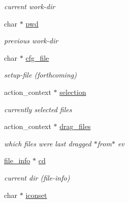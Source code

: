\begin{CompactItemize}
\begin{CompactList}\small\item\em current work-dir \item\end{CompactList}\item 
\hypertarget{struct__noir__sess_o19}{
char $\ast$ \hyperlink{struct__noir__sess_o19}{pwd}}
\label{struct__noir__sess_o19}

\begin{CompactList}\small\item\em previous work-dir \item\end{CompactList}\item 
\hypertarget{struct__noir__sess_o20}{
char $\ast$ \hyperlink{struct__noir__sess_o20}{cfg\_\-file}}
\label{struct__noir__sess_o20}

\begin{CompactList}\small\item\em setup-file (forthcoming) \item\end{CompactList}\item 
\hypertarget{struct__noir__sess_o21}{
action\_\-context $\ast$ \hyperlink{struct__noir__sess_o21}{selection}}
\label{struct__noir__sess_o21}

\begin{CompactList}\small\item\em currently selected files \item\end{CompactList}\item 
\hypertarget{struct__noir__sess_o22}{
action\_\-context $\ast$ \hyperlink{struct__noir__sess_o22}{drag\_\-files}}
\label{struct__noir__sess_o22}

\begin{CompactList}\small\item\em which files were last dragged $\ast$from$\ast$ ev \item\end{CompactList}\item 
\hypertarget{struct__noir__sess_o23}{
\hyperlink{struct__file__info}{file\_\-info} $\ast$ \hyperlink{struct__noir__sess_o23}{cd}}
\label{struct__noir__sess_o23}

\begin{CompactList}\small\item\em current dir (file-info) \item\end{CompactList}\item 
\hypertarget{struct__noir__sess_o24}{
char $\ast$ \hyperlink{struct__noir__sess_o24}{iconset}}
\label{struct__noir__sess_o24}


\end{CompactItemize}

